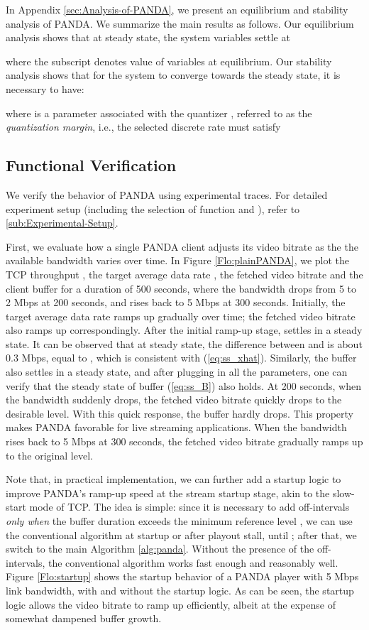 \documentclass[conference]{IEEEtran}
\theoremstyle{plain}
\theoremstyle{definition}
\theoremstyle{plain}
\theoremstyle{plain}
\begin{document}
In Appendix \ref{sec:Analysis-of-PANDA}, we present an equilibrium
and stability analysis of PANDA. We summarize the main results as
follows. Our equilibrium analysis shows that at steady state, the
system variables settle at

where the subscript  denotes value of variables at equilibrium.
Our stability analysis shows that for the system to converge towards
the steady state, it is necessary to have:

where  is a parameter associated with the quantizer ,
referred to as the \emph{quantization margin}, i.e., the selected
discrete rate  must satisfy




\subsection{Functional Verification}

We verify the behavior of PANDA using experimental traces. For detailed
experiment setup (including the selection of function 
and ), refer to \ref{sub:Experimental-Setup}. 

First, we evaluate how a single PANDA client adjusts its video bitrate
as the the available bandwidth varies over time. In Figure \ref{Flo:plainPANDA},
we plot the TCP throughput , the target average data rate
, the fetched video bitrate  and the client buffer 
for a duration of 500 seconds, where the bandwidth drops from 5 to
2 Mbps at 200 seconds, and rises back to 5 Mbps at 300 seconds. Initially,
the target average data rate  ramps up gradually over time;
the fetched video bitrate  also ramps up correspondingly. After
the initial ramp-up stage,  settles in a steady state. It
can be observed that at steady state, the difference between 
and  is about 0.3 Mbps, equal to , which is consistent
with (\ref{eq:ss_xhat}). Similarly, the buffer  also settles
in a steady state, and after plugging in all the parameters, one can
verify that the steady state of buffer (\ref{eq:ss_B}) also holds.
At 200 seconds, when the bandwidth suddenly drops, the fetched video
bitrate quickly drops to the desirable level. With this quick response,
the buffer hardly drops. This property makes PANDA favorable for live
streaming applications. When the bandwidth rises back to 5 Mbps at
300 seconds, the fetched video bitrate gradually ramps up to the original
level.

Note that, in practical implementation, we can further add a startup
logic to improve PANDA's ramp-up speed at the stream startup stage,
akin to the slow-start mode of TCP. The idea is simple: since it is
necessary to add off-intervals \emph{only when} the buffer duration
 exceeds the minimum reference level , we can use
the conventional algorithm at startup or after playout stall, until
; after that, we switch to the main Algorithm
\ref{alg:panda}. Without the presence of the off-intervals, the conventional
algorithm works fast enough and reasonably well. Figure \ref{Flo:startup}
shows the startup behavior of a PANDA player with 5 Mbps link bandwidth,
with and without the startup logic. As can be seen, the startup logic
allows the video bitrate to ramp up efficiently, albeit at the expense
of somewhat dampened buffer growth.
\end{document}

